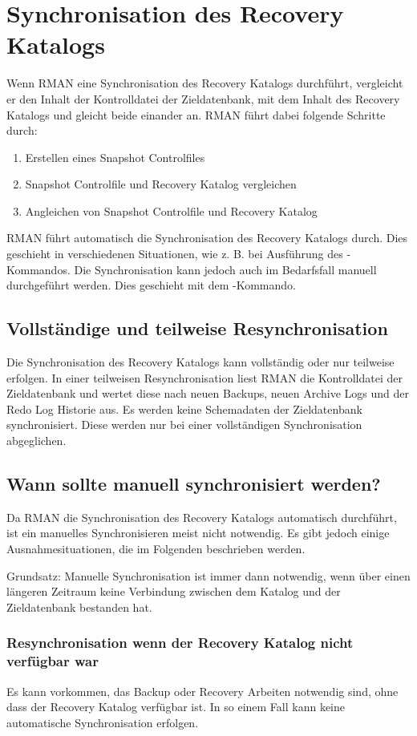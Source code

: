     \section{Synchronisation des Recovery Katalogs}
      Wenn RMAN eine Synchronisation des Recovery Katalogs durchführt, vergleicht er den Inhalt der Kontrolldatei der Zieldatenbank, mit dem Inhalt des Recovery Katalogs und gleicht beide einander an. RMAN führt dabei folgende Schritte durch:
      \begin{enumerate}
        \item Erstellen eines Snapshot Controlfiles
        \item Snapshot Controlfile und Recovery Katalog vergleichen
        \item Angleichen von Snapshot Controlfile und Recovery Katalog
      \end{enumerate}
      RMAN führt automatisch die Synchronisation des Recovery Katalogs durch. Dies geschieht in verschiedenen Situationen, wie z. B. bei Ausführung des -Kommandos. Die Synchronisation kann jedoch auch im Bedarfsfall manuell durchgeführt werden. Dies geschieht mit dem -Kommando.
      \subsection{Vollständige und teilweise Resynchronisation}
        Die Synchronisation des Recovery Katalogs kann vollständig oder nur teilweise erfolgen. In einer teilweisen Resynchronisation liest RMAN die Kontrolldatei der Zieldatenbank und wertet diese nach neuen Backups, neuen Archive Logs und der Redo Log Historie aus. Es werden keine Schemadaten der Zieldatenbank synchronisiert. Diese werden nur bei einer vollständigen Synchronisation abgeglichen.
      \subsection{Wann sollte manuell synchronisiert werden?}
        Da RMAN die Synchronisation des Recovery Katalogs automatisch durchführt, ist ein manuelles Synchronisieren meist nicht notwendig. Es gibt jedoch einige Ausnahmesituationen, die im Folgenden beschrieben werden.
        \begin{merke}
          Grundsatz: Manuelle Synchronisation ist immer dann notwendig, wenn über einen längeren Zeitraum keine Verbindung zwischen dem Katalog und der Zieldatenbank bestanden hat.
        \end{merke}
        \subsubsection{Resynchronisation wenn der Recovery Katalog nicht verfügbar war}
          Es kann vorkommen, das Backup oder Recovery Arbeiten notwendig sind, ohne dass der Recovery Katalog verfügbar ist. In so einem Fall kann keine automatische Synchronisation erfolgen.
